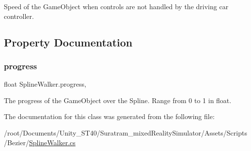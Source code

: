Speed of the Game\+Object when controls are not handled by the driving car controller.



\subsection{Property Documentation}
\mbox{\label{classSplineWalker_a261aa79e4051461acff99d39f2b09a98}} 
\subsubsection{\texorpdfstring{progress}{progress}}
{\footnotesize\ttfamily float Spline\+Walker.\+progress\hspace{0.3cm}{\ttfamily [get]}, {}}



The progress of the Game\+Object over the Spline. Range from 0 to 1 in float.



The documentation for this class was generated from the following file\+:\begin{DoxyCompactItemize}
\item 
/root/\+Documents/\+Unity\+\_\+\+S\+T40/\+Suratram\+\_\+mixed\+Reality\+Simulator/\+Assets/\+Scripts/\+Bezier/\hyperlink{SplineWalker_8cs}{Spline\+Walker.\+cs}\end{DoxyCompactItemize}
